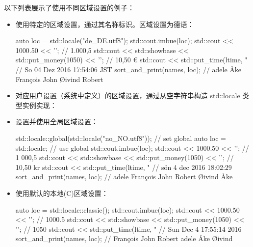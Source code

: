 以下列表展示了使用不同区域设置的例子：

\begin{itemize}
\item
使用特定的区域设置，通过其名称标识。区域设置为德语：

\begin{cpp}
auto loc = std::locale("de_DE.utf8");
std::cout.imbue(loc);
std::cout << 1000.50 << '\n';
// 1.000,5
std::cout << std::showbase << std::put_money(1050) << '\n';
// 10,50 €
std::cout << std::put_time(ltime, "%
// So 04 Dez 2016 17:54:06 JST
sort_and_print(names, loc);
// adele Åke François John Øivind Robert
\end{cpp}

\item
对应用户设置（系统中定义）的区域设置，通过从空字符串构造 std::locale 类型实例实现：


\item
设置并使用全局区域设置：

\begin{cpp}
std::locale::global(std::locale("no_NO.utf8")); // set global
auto loc = std::locale{};                       // use global
std::cout.imbue(loc);
std::cout << 1000.50 << '\n';
// 1 000,5
std::cout << std::showbase << std::put_money(1050) << '\n';
// 10,50 kr
std::cout << std::put_time(ltime, "%
// sön 4 dec 2016 18:02:29
sort_and_print(names, loc);
// adele François John Robert Øivind Åke
\end{cpp}

\item
使用默认的本地(C)区域设置：

\begin{cpp}
auto loc = std::locale::classic();
std::cout.imbue(loc);
std::cout << 1000.50 << '\n';
// 1000.5
std::cout << std::showbase << std::put_money(1050) << '\n';
// 1050
std::cout << std::put_time(ltime, "%
// Sun Dec 4 17:55:14 2016
sort_and_print(names, loc);
// François John Robert adele Åke Øivind
\end{cpp}
\end{itemize}

